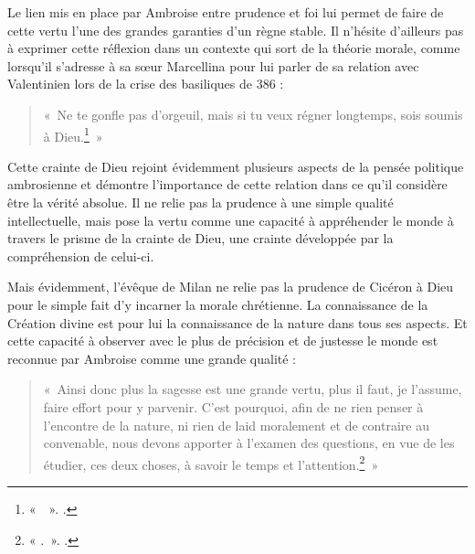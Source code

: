 \bigskip

Le lien mis en place par Ambroise entre prudence et foi lui permet de faire de cette vertu l'une des grandes garanties d'un règne stable. Il n'hésite d'ailleurs pas à exprimer cette réflexion dans un contexte qui sort de la théorie morale, comme lorsqu'il s'adresse à sa sœur Marcellina pour lui parler de sa relation avec Valentinien lors de la crise des basiliques de 386 :

\bigskip

\begin{quote}
«~Ne te gonfle pas d'orgeuil, mais si tu veux régner longtemps, sois soumis à Dieu.\footnote{«~~». \cite[, 19]{ambroise_lettres}.}~»
\end{quote}

\bigskip

Cette crainte de Dieu rejoint évidemment plusieurs aspects de la pensée politique ambrosienne et démontre l'importance de cette relation dans ce qu'il considère être la vérité absolue. Il ne relie pas la prudence à une simple qualité intellectuelle, mais pose la vertu comme une capacité à appréhender le monde à travers le prisme de la crainte de Dieu, une crainte développée par la compréhension de celui-ci.

\bigskip

Mais évidemment, l'évêque de Milan ne relie pas la prudence de Cicéron à Dieu pour le simple fait d'y incarner la morale chrétienne. La connaissance de la Création divine est pour lui la connaissance de la nature dans tous ses aspects. Et cette capacité à observer avec le plus de précision et de justesse le monde est reconnue par Ambroise comme une grande qualité :

\bigskip

\begin{quote}
«~Ainsi donc plus la sagesse est une grande vertu, plus il faut, je l'assume, faire effort pour y parvenir. C'est pourquoi, afin de ne rien penser à l'encontre de la nature, ni rien de laid moralement et de contraire au convenable, nous devons apporter à l'examen des questions, en vue de les étudier, ces deux choses, à savoir le temps et l'attention.\footnote{« .~». \cite[\nopp I, 124]{ambroise_devoirs_1}.}~»
\end{quote}


